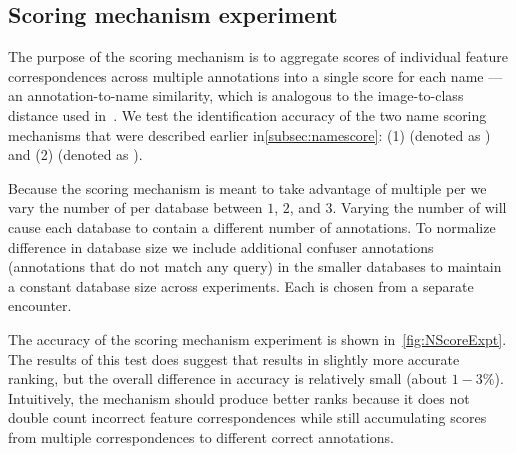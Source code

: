         \kptstype{}

    \subsection{Scoring mechanism experiment}\label{sub:exptscoremech}  


        The purpose of the scoring mechanism is to aggregate scores of individual feature correspondences across
          multiple annotations into a single score for each name --- \ie{} an annotation-to-name similarity, which
          is analogous to the image-to-class distance used in~\cite{boiman_defense_2008}.
        We test the identification accuracy of the two name scoring mechanisms that were described earlier
          in\cref{subsec:namescore}:
        (1) \cscoring{} (denoted as \csum{}) and
        (2) \nscoring{} (denoted as \nsum{}).

        \NScoreExpt{}

        Because the scoring mechanism is meant to take advantage of multiple \exemplars{} per \name{} we vary the
          number of \exemplars{} per database \name{} between $1$, $2$, and $3$.
        Varying the number of \exemplars{} will cause each database to contain a different number of annotations.
        To normalize difference in database size we include additional confuser annotations (annotations that do
          not match any query) in the smaller databases to maintain a constant database size across experiments.
        Each \exemplar{} is chosen from a separate encounter.

        The accuracy of the scoring mechanism experiment is shown in~\cref{fig:NScoreExpt}.
        The results of this test does suggest that \nsum{} results in slightly more accurate ranking, but the
          overall difference in accuracy is relatively small (about $1-3\percent$).
        Intuitively, the \nsum{} mechanism should produce better ranks because it does not double count incorrect
          feature correspondences while still accumulating scores from multiple correspondences to different
          correct annotations.


